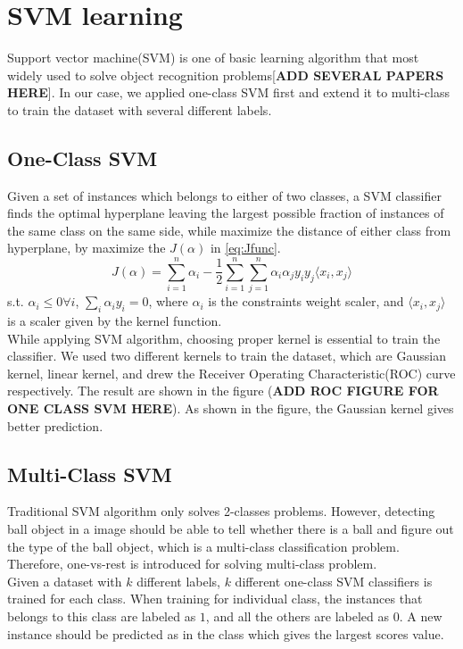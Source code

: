 \documentclass{article}
\begin{document}
\section{SVM learning}
Support vector machine(SVM) is one of basic learning algorithm that most widely used to solve object recognition problems[\textbf{ADD SEVERAL PAPERS HERE}]. In our case, we applied one-class SVM first and extend it to multi-class to train the dataset with several different labels.
\subsection{One-Class SVM}
Given a set of instances which belongs to either of two classes, a SVM classifier finds the optimal hyperplane leaving the largest possible fraction of instances of the same class on the same side, while maximize the distance of either class from hyperplane, by maximize the $J(\alpha)$ in \ref{eq:Jfunc}.
\begin{equation}
J(\alpha) = \sum_{i=1}^n \alpha_i - \frac{1}{2}\sum_{i=1}^n\sum_{j=1}^n \alpha_i \alpha_jy_iy_j\langle x_i,x_j\rangle
\label{eq:Jfunc}
\end{equation}
s.t. $\alpha_i\leq 0 \forall i$, $\sum_i \alpha_iy_i = 0$,
where $\alpha_i$ is the constraints weight scaler, and $\langle x_i,x_j \rangle$ is a scaler given by the kernel function.\\
While applying SVM algorithm, choosing proper kernel is essential to train the classifier. We used two different kernels to train the dataset, which are Gaussian kernel, linear kernel, and drew the Receiver	Operating Characteristic(ROC) curve respectively. The result are shown in the figure (\textbf{ADD ROC FIGURE FOR ONE CLASS SVM HERE}). As shown in the figure, the Gaussian kernel gives better prediction. 
\subsection{Multi-Class SVM}
Traditional SVM algorithm only solves 2-classes problems. However, detecting ball object in a image should be able to tell whether there is a ball and figure out the type of the ball object, which is a multi-class classification problem. Therefore, one-vs-rest is introduced for solving multi-class problem.\\
Given a dataset with $k$ different labels, $k$ different one-class SVM classifiers is trained for each class. When training for individual class, the instances that belongs to this class are labeled as $1$, and all the others are labeled as $0$. A new instance should be predicted as in the class which gives the largest scores value.\\
\end{document}
